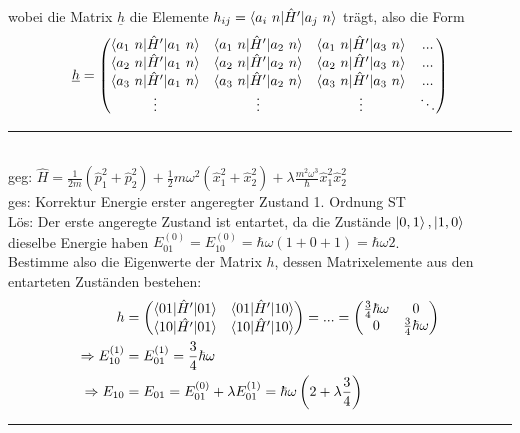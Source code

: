 \documentclass{article}
\newcommand{\lr}[1]{\left(#1\right)}
\begin{document}
wobei die Matrix $\underline{h}$ die Elemente $h_{ij} = \braket{a_i\ n | \hat{H}' | a_j\ n}$ trägt, also die Form
	\begin{equation}
		\underline{h} =
		\begin{pmatrix}
			\braket{a_1\ n | \hat{H}' | a_1\ n} & \braket{a_1\ n | \hat{H}' | a_2\ n} & \braket{a_1\ n | \hat{H}' | a_3\ n} & ... \\
			\braket{a_2\ n | \hat{H}' | a_1\ n} & \braket{a_2\ n | \hat{H}' | a_2\ n} & \braket{a_2\ n | \hat{H}' | a_3\ n} & ... \\
			\braket{a_3\ n | \hat{H}' | a_1\ n} & \braket{a_3\ n | \hat{H}' | a_2\ n} & \braket{a_3\ n | \hat{H}' | a_3\ n} & ... \\
			\vdots & \vdots & \vdots & \ddots
		\end{pmatrix}
	\end{equation}

\vspace{0.5cm}

{\color{blue}
\hrule
	\\
	geg: $\hat{H} = \frac{1}{2m}(\hat{p}_1^2 + \hat{p}_2^2) + \frac{1}{2}m\omega^2(\hat{x}_1^2 + \hat{x}_2^2) + \lambda\frac{m^2\omega^3}{\hbar}\hat{x}_1^2\hat{x}_2^2$ \\
	ges: Korrektur Energie erster angeregter Zustand 1. Ordnung ST \\
	Lös: Der erste angeregte Zustand ist entartet, da die Zustände $\ket{0, 1}, \ket{1,0}$ dieselbe Energie haben $E_{01}^{(0)} = E_{10}^{(0)} = \hbar\omega(1+0+1) = \hbar\omega 2$.\\
	Bestimme also die Eigenwerte der Matrix $h$, dessen Matrixelemente aus den entarteten Zuständen bestehen:
		\begin{align*}
			h &=
			\begin{pmatrix}
				\braket{0 1 | \hat{H}' | 0 1} & \braket{0 1| \hat{H}' | 1 0} \\
				\braket{1 0 | \hat{H'} | 0 1} & \braket{1 0 | \hat{H}' | 1 0}
			\end{pmatrix} =...=
			\begin{pmatrix}
				\frac{3}{4}\hbar\omega & 0 \\
				0 & \frac{3}{4}\hbar\omega
			\end{pmatrix} \\
			\Rightarrow E_{10}^{(1)} &= E_{01}^{(1)} = \frac{3}{4}\hbar\omega \\
			\Rightarrow E_{10} &= E_{01} = E_{01}^{(0)} + \lambda E_{01}^{(1)} = \hbar\omega \lr{ 2 + \lambda\frac{3}{4} }
		\end{align*}
\hrule
}
\end{document}
